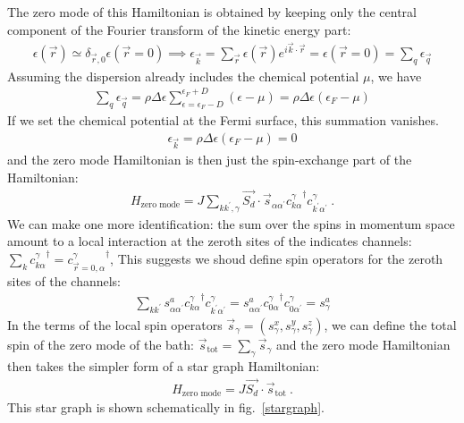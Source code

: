 \documentclass[12pt]{revtex4-2}
\begin{document}
The zero mode of this Hamiltonian is obtained by keeping only the central component of the Fourier transform of the kinetic energy part:
\begin{align}
	\epsilon(\vec r) \simeq \delta_{\vec r,0}\epsilon(\vec r = 0) \implies \epsilon_{\vec k} = \sum_{\vec r}\epsilon(\vec r) e^{i \vec{k}\cdot\vec{r}} = \epsilon(\vec r=0) = \sum_q \epsilon_{\vec q}
\end{align}
Assuming the dispersion already includes the chemical potential \(\mu\), we have 
\begin{align}
\sum_q \epsilon_{\vec q} = \rho \Delta \epsilon\sum_{\epsilon=\epsilon_F-D}^{\epsilon_F + D} \left(\epsilon - \mu\right) = \rho\Delta \epsilon\left(\epsilon_F - \mu\right)
\end{align}
If we set the chemical potential at the Fermi surface, this summation vanishes.
\begin{align}
	\epsilon_{\vec k} =  \rho\Delta \epsilon\left(\epsilon_F - \mu\right) = 0
\end{align}
and the zero mode Hamiltonian is then just the spin-exchange part of the Hamiltonian:
\begin{align}
	H_\text{zero mode} = J\sum_{kk^\prime,\gamma} \vec{S_d}\cdot\vec{s}_{\alpha\alpha^\prime}{c^\gamma_{k\alpha}}^\dagger c^\gamma_{k^\prime\alpha^\prime}~.
\end{align}
We can make one more identification: the sum over the spins in momentum space amount to a local interaction at the zeroth sites of the indicates channels: \(\sum_k {c^\gamma_{k\alpha}}^\dagger = {c^\gamma_{\vec r=0, \alpha}}^\dagger\), This suggests we shoud define spin operators for the zeroth sites of the channels:
\begin{align}
	\sum_{kk^\prime} {s}^a_{\alpha\alpha^\prime}{c^\gamma_{k\alpha}}^\dagger c^\gamma_{k^\prime\alpha^\prime} = {s}^a_{\alpha\alpha^\prime}{c^\gamma_{0\alpha}}^\dagger c^\gamma_{0\alpha^\prime} = s_\gamma^a
\end{align}
In the terms of the local spin operators \(\vec s_\gamma = (s_\gamma^x,s_\gamma^y,s_\gamma^z)\), we can define the total spin of the zero mode of the bath: \(\vec s_\text{tot} = \sum_\gamma \vec s_\gamma\) and the zero mode Hamiltonian then takes the simpler form of a star graph Hamiltonian:
\begin{align}
	\label{zeromode_ham}
	H_\text{zero mode} = J \vec{S_d}\cdot\vec{s}_\text{tot}~.
\end{align}
This star graph is shown schematically in fig.~\ref{stargraph}.
\end{document}
